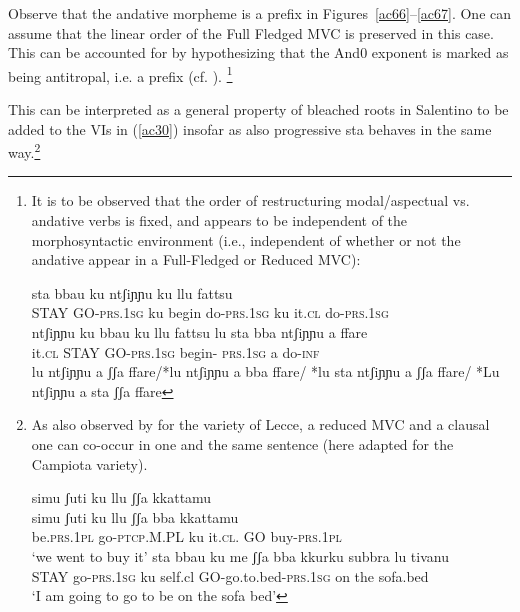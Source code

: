 \documentclass[output=paper]{langscibook}
\begin{document}
Observe that the andative morpheme is a prefix in Figures~\ref{ac66}--\ref{ac67}.  One can assume that the linear order of the Full Fledged MVC is preserved in this case.  This can be accounted for by hypothesizing that the And0 exponent is marked as being antitropal, i.e. a prefix (cf. \citealt{bye2012a}).
\footnote{It is to be observed that the order of restructuring modal/aspectual vs. andative verbs is fixed, and appears to be independent of the morphosyntactic environment (i.e., independent of whether or not the andative appear in a Full-Fledged or Reduced MVC):

\ea \label{fn32ex}
    \ea \label{fn32exa}\gll sta bbau   ku ntʃiɲɲu   ku llu  fattsu\\
STAY GO-\textsc{prs}.\textsc{1sg} ku  begin do-\textsc{prs}.\textsc{1sg}  ku it.\textsc{cl} do-\textsc{prs}.\textsc{1sg}\\
\glt *ntʃiɲɲu ku bbau ku llu fattsu
    \ex \label{fn32exb}\gll lu  sta  bba   ntʃiɲɲu      a   ffare\\
it.\textsc{cl}  STAY GO-\textsc{prs}.\textsc{1sg} begin- \textsc{prs}.\textsc{1sg}  a   do-\textsc{inf}\\
\glt *lu ntʃiɲɲu a ʃʃa ffare/*lu ntʃiɲɲu a bba ffare/ *lu sta ntʃiɲɲu a ʃʃa ffare/ *Lu  ntʃiɲɲu a sta ʃʃa ffare
    \z
\z

}

This can be interpreted as a general property of bleached roots in Salentino to be added to the VIs in (\ref{ac30}) insofar as also progressive sta behaves in the same way.\footnote{As also observed by \citealt{ledgeway2016a} for the variety of Lecce, a reduced MVC and a clausal one can co-occur in one and the same sentence (here adapted for the Campiota variety).

\ea \label{fn33ex}
    \ea \label{fn33exa}\glll simu      ʃuti        ku   llu     ʃʃa {} kkattamu\\
  simu      ʃuti       ku   llu    ʃʃa  bba kkattamu\\
  be.\textsc{prs}.\textsc{1pl} go-\textsc{ptcp}.M.PL  ku   it.\textsc{cl}.    GO  buy-\textsc{prs}.\textsc{1pl}\\
\glt  ‘we went to buy it’
    \ex \label{fn33exb}
    \gll sta   bbau                         ku  me       {ʃʃa bba           kkurku}      subbra lu tivanu\\
         STAY  go-\textsc{prs}.\textsc{1sg} ku  self.cl  GO-go.to.bed-\textsc{prs}.\textsc{1sg} on  the sofa.bed\\
    \glt ‘I am going to go to be on the sofa bed’
    \z
\z}
\end{document}
